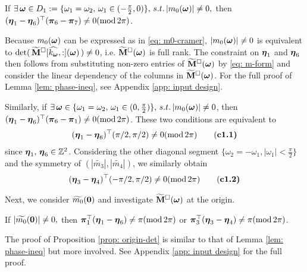 \begin{lemma}\label{lem: phase-ineq}
If $\exists\,\boldsymbol{\omega}\in D_1:=\{\omega_1=\omega_2,\,\omega_1\in(-\frac{\pi}{2},0)\},\,s.t. \,|m_0(\boldsymbol{\omega})|\neq 0,$ then $(\boldsymbol{\eta}_1-\boldsymbol{\eta}_6)^\top (\boldsymbol{\pi}_6-\boldsymbol{\pi}_7)\neq 0(\text{mod}\,2\pi)$. 
\end{lemma} 

Because $m_0(\boldsymbol{\omega})$ can be expressed as in \eqref{eq: m0-cramer}, $|m_0(\boldsymbol{\omega})|\neq 0$ is equivalent to $\det(\,\widetilde{\mathbf{M}}^{\Box}[\widehat{k_{\boldsymbol{\omega}}},:](\boldsymbol{\omega})\,)\neq 0$, i.e. $\widetilde{\mathbf{M}}^{\Box}(\boldsymbol{\omega})$ is full rank. The constraint on $\boldsymbol{\eta}_1$ and $\boldsymbol{\eta}_6$ then follows from substituting non-zero entries of $\widetilde{\mathbf{M}}^{\Box}(\boldsymbol{\omega})$ by \eqref{eq: m-form} and consider the linear dependency of the columns in $\widetilde{\mathbf{M}}^{\Box}(\boldsymbol{\omega})$. For the full proof of Lemma \ref{lem: phase-ineq}, see Appendix \ref{app: input design}.

Similarly, if $\exists\,\boldsymbol{\omega}\in \{\omega_1 = \omega_2,\, \omega_1\in(0,\frac{\pi}{2})\},\, s.t.\, |m_0(\boldsymbol{\omega})| \neq 0$, then $(\boldsymbol{\eta}_1-\boldsymbol{\eta}_6)^\top (\boldsymbol{\pi}_6-\boldsymbol{\pi}_1)\neq 0(\text{mod}\,2\pi)$. These two conditions are equivalent to 
\begin{align*}
(\boldsymbol{\eta}_1-\boldsymbol{\eta}_6)^\top(\pi/2,\pi/2)\neq 0 (\text{mod}\,2\pi)\tag{\bf c1.1}
\end{align*}
since $\boldsymbol{\eta}_1,\,\boldsymbol{\eta}_6\in\mathbb{Z}^2$.
Considering the other diagonal segment $\{\omega_2 = -\omega_1, |\omega_1| <\frac{\pi}{2}\}$ and the symmetry of $(|\widetilde{m_3}|, |\widetilde{m_4}|)$, we similarly obtain
\begin{align*}
(\boldsymbol{\eta}_3-\boldsymbol{\eta}_4)^\top(-\pi/2,\pi/2)\neq 0 (\text{mod}\, 2\pi)\tag{\bf c1.2}
\end{align*}

Next, we consider $\widetilde{m_0}(\boldsymbol{0})$ and investigate $\widetilde{\mathbf{M}}^{\Box}(\boldsymbol{\omega})$ at the origin.
\begin{proposition}\label{prop: origin-det}
If $|\widetilde{m_0}(\boldsymbol{0})|\neq 0,$ then $\boldsymbol{\pi}_1^\top(\boldsymbol{\eta}_1-\boldsymbol{\eta}_6)\neq \pi(\text{mod}\,2\pi)$ or $\boldsymbol{\pi}_3^\top(\boldsymbol{\eta}_3-\boldsymbol{\eta}_4)\neq \pi(\text{mod}\,2\pi)$. 
\end{proposition}
The proof of Proposition \ref{prop: origin-det} is similar to that of Lemma \ref{lem: phase-ineq} but more involved. See Appendix \ref{app: input design} for the full proof.

